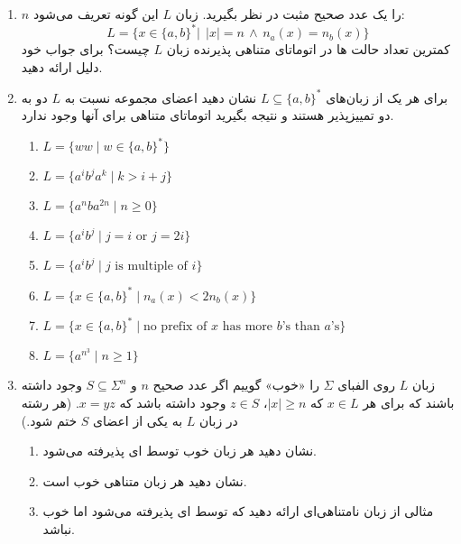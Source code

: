 \documentclass{article}
\newcommand*\circled[1]{
	\tikz[baseline=(char.base)]{
		\node[shape=circle,draw,inner sep=-1pt,color=red] (char) {\textcolor{black}{#1}\strut}
	}\kern-3pt
}
\renewcommand{\labelenumii}{\alph{enumii})}
\let\oldlabelenumi=\labelenumi
\let\oldlabelenumii=\labelenumii
\newcommand{\StartCircledEnumi}{\renewcommand{\labelenumi}{\circled{\oldlabelenumi}}}
\newcommand{\EndCircledEnumi}{\renewcommand{\labelenumi}{\oldlabelenumi}}
\newcommand{\StartCircledEnumii}{\renewcommand{\labelenumii}{\circled{\oldlabelenumii}}}
\newcommand{\EndCircledEnumii}{\renewcommand{\labelenumii}{\oldlabelenumii}}
\newcommand{\CircledEnumi}{\StartCircledEnumi\item\EndCircledEnumi}
\newcommand{\CircledEnumii}{\StartCircledEnumii\item\EndCircledEnumii}
\begin{document}
\begin{enumerate}
		
		\item 
		$n$
		را یک عدد صحیح مثبت در نظر بگیرید. زبان $L$ این گونه تعریف می‌شود:
		$$ L =\{ x \in \{ a,b \}^* | \;\, |x| = n \, \land \, n_a(x) = n_b(x)\}  $$
		کمترین تعداد حالت ها  در اتوماتای متناهی پذیرنده زبان $L$ چیست؟
		برای جواب خود دلیل ارائه دهید.
		 \\
		
		\item 
		برای هر یک از زبان‌های
		$L \subseteq \{a, b\}^*$
		نشان دهید اعضای مجموعه 
		نسبت به $L$ دو به دو تمییزپذیر
		هستند و نتیجه بگیرید اتوماتای متناهی 
		برای آنها وجود ندارد.
		\begin{latin}
			\begin{enumerate}
				\item $L = \{ww \; | \;  w \in \{a,b\}^*\}$
			\item $L = \{a^ib^ja^k \; | \; k >  i + j \}$
				\CircledEnumii $L = \{a^nba^{2n} \; | \; n \geq 0\}$
				
				\CircledEnumii $L = \{a^ib^j \; | \; \text{$j = i$ or $j = 2i$}\}$
				\CircledEnumii $L = \{a^ib^j \; | \; \text{$j$ is multiple of $i$}\}$
				\CircledEnumii $L = \{x \in \{a,b\}^* \; | \; n_a(x) < 2n_b(x) \}$
				\CircledEnumii $L = \{x \in \{a,b\}^* \; | \; \text{no prefix of $x$ has more $b$'s than $a$'s} \}$
				\CircledEnumii $L = \{a^{n^3} \; | \;  n \geq 1\}$
				
			\end{enumerate}
		\end{latin}
	\CircledEnumi
	زبان $L$ روی الفبای $\Sigma$ را «خوب» گوییم اگر عدد صحیح $n$ و $S \subseteq \Sigma^n$ وجود داشته باشند که برای هر $x \in L$ که $|x| \geq n$، 
	$z \in S$
وجود داشته باشد که $x = yz$. (هر رشته در زبان $L$ به یکی از اعضای $S$ ختم شود.)

		\begin{enumerate}
		
		\item 
		نشان دهید هر زبان خوب توسط ای پذیرفته می‌شود.
		\item 
		نشان دهید هر زبان متناهی خوب است.
		\item 
		مثالی از زبان نامتناهی‌ای ارائه دهید که توسط ای پذیرفته می‌شود اما خوب نباشد.
		\end{enumerate}	
		
	\end{enumerate}
	
	
\end{document}
